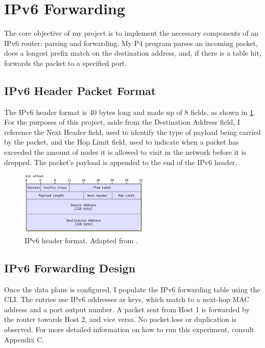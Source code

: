 \section{IPv6 Forwarding}
\label{sec:3.4}

The core objective of my project is to implement the necessary components of an IPv6 router: parsing and forwarding. My P4 program parses an incoming packet, does a longest prefix match on the destination address, and, if there is a table hit, forwards the packet to a specified port.



\subsection{IPv6 Header Packet Format}
\label{sec:3.4.1}

The IPv6 header format is 40 bytes long and made up of 8 fields, as shown in \cref{fig:impl-ipv6header}. For the purposes of this project, aside from the Destination Address field, I reference the Next Header field, used to identify the type of payload being carried by the packet, and the Hop Limit field, used to indicate when a packet has exceeded the amount of nodes it is allowed to visit in the network before it is dropped. The packet's payload is appended to the end of the IPv6 header.

\begin{figure}[htbp]
  \centering
    \includegraphics[width=0.55\textwidth]{figures/implementation/ipv6_header.png}
    \caption{IPv6 header format. Adapted from \cite{IPguide}.}
    \label{fig:impl-ipv6header}
\end{figure}



\subsection{IPv6 Forwarding Design}
\label{sec:3.4.2}

Once the data plane is configured, I populate the IPv6 forwarding table using the CLI. The entries use IPv6 addresses as keys, which match to a next-hop MAC address and a port output number. A packet sent from Host 1 is forwarded by the router towards Host 2, and vice versa. No packet loss or duplication is observed. For more detailed information on how to run this experiment, consult Appendix C.



